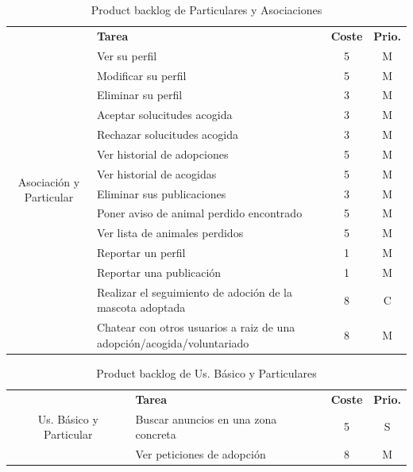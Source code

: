 \begin{table}[H]
    \centering
    \begin{tabular}{|c |p{8cm}|c |c|} \hline 
         \multirow[c]{17}{2cm}{Asociación y Particular}&  \textbf{Tarea}&  \textbf{Coste}& \textbf{Prio.}\\  \cline{2-4}

         &  Ver su perfil &  5& M\\ \cline{2-4}
         &  Modificar su perfil &  5& M\\ \cline{2-4}
         &  Eliminar su perfil &  3& M\\ \cline{2-4}
         
         &  Aceptar solucitudes acogida&  3& M\\ \cline{2-4}
         &  Rechazar solucitudes acogida&  3& M\\ \cline{2-4}
         
         &  Ver historial de adopciones &  5& M\\ \cline{2-4}
         &  Ver historial de acogidas &  5& M\\ \cline{2-4}
         &  Eliminar sus publicaciones &  3& M\\ \cline{2-4}
         
         & Poner aviso de animal perdido encontrado & 5 & M \\ \cline{2-4}
         & Ver lista de animales perdidos & 5 & M \\ \cline{2-4}

         &  Reportar un perfil &  1& M\\ \cline{2-4}
         &  Reportar una publicación &  1& M\\ \cline{2-4}
         
         &  Realizar el seguimiento de adoción de la mascota adoptada&  8& C\\ \cline{2-4}
         
         &  Chatear con otros usuarios a raiz de una adopción/acogida/voluntariado &  8& M\\ \hline

         
         
    \end{tabular}
    \caption{Product backlog de Particulares y Asociaciones}
    \label{tab:pb_aso_particular}
\end{table}

\begin{table}[H]
    \centering
    \begin{tabular}{|c |p{8cm}|c |c|} \hline 
         \multirow[c]{4}{2cm}{Us. Básico y Particular}&  \textbf{Tarea}&  \textbf{Coste}& \textbf{Prio.}\\  \cline{2-4}
         
		 &  Buscar anuncios en una zona concreta&  5& S\\ \cline{2-4}		
         &  Ver peticiones de adopción&  8& M\\ \hline

         
         
    \end{tabular}
    \caption{Product backlog de Us. Básico y Particulares}
    \label{tab:pb_part_usBasico}
\end{table}

